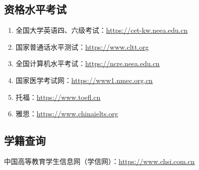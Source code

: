 \subsection[资格水平考试]{资格水平考试}
\begin{enumerate}
    \item 全国大学英语四、六级考试：\uline{\href{https://cet-kw.neea.edu.cn}{https://cet-kw.neea.edu.cn}}
    \item 国家普通话水平测试：\uline{\href{https://www.cltt.org}{https://www.cltt.org}}
    \item 全国计算机水平考试：\uline{\href{https://ncre.neea.edu.cn}{https://ncre.neea.edu.cn}}
    \item 国家医学考试网：\uline{\href{https://www1.nmec.org.cn}{https://www1.nmec.org.cn}}
    \item 托福：\uline{\href{https://www.toefl.cn}{https://www.toefl.cn}}
    \item 雅思：\uline{\href{https://www.chinaielts.org}{https://www.chinaielts.org}}
\end{enumerate}

\subsection[学籍查询]{学籍查询}
\label{student_status_query}
中国高等教育学生信息网（学信网）：\uline{\href{https://www.chsi.com.cn}{https://www.chsi.com.cn}}

\newpage
